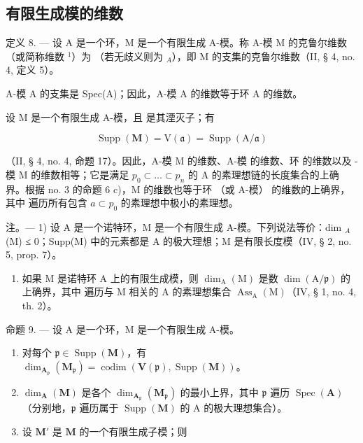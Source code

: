 \subsection{有限生成模的维数}

定义 8. — 设 A 是一个环，M 是一个有限生成 A-模。称 A-模 M 的克鲁尔维数（或简称维数 \(^{1}\)）为  （若无歧义则为 \(_{A}\)），即 M 的支集的克鲁尔维数（II, § 4, no. 4, 定义 5）。

A-模 A 的支集是 Spec(A)；因此，A-模 A 的维数等于环 A 的维数。

设 M 是一个有限生成 A-模，且  是其湮灭子；有

\[
\operatorname{Supp} (\mathbf {M}) = \mathrm{V} (\mathfrak {a}) = \operatorname{Supp} (\mathrm{A} / \mathfrak {a})
\]

（II, § 4, no. 4, 命题 17）。因此，A-模 M 的维数、A-模  的维数、环  的维数以及  -模 M 的维数相等；它是满足 \(p_0 \subset \ldots \subset p_n\) 的 A 的素理想链的长度集合的上确界。根据 no. 3 的命题 6 c)，M 的维数也等于环  （或 A-模）  的维数的上确界，其中  遍历所有包含 \(a \subset p_0\) 的素理想中极小的素理想。

注。— 1) 设 A 是一个诺特环，M 是一个有限生成 A-模。下列说法等价：dim \(_{A}\) (M) ≤ 0；Supp(M) 中的元素都是 A 的极大理想；M 是有限长度模（IV, § 2, no. 5, prop. 7）。

\begin{enumerate}
\def\labelenumi{\arabic{enumi})}
\setcounter{enumi}{1}
\tightlist
\item
  如果 M 是诺特环 A 上的有限生成模，则 \(\dim_{\mathrm{A}}(\mathrm{M})\) 是数 \(\dim(\mathrm{A}/\mathfrak{p})\) 的上确界，其中  遍历与 M 相关的 A 的素理想集合 \(\operatorname{Ass}_{\mathrm{A}}(\mathrm{M})\)（IV, § 1, no. 4, th. 2）。
\end{enumerate}

命题 9. — 设 A 是一个环，M 是一个有限生成 A-模。

\begin{enumerate}
\def\labelenumi{\alph{enumi})}
\item
  对每个 \(\mathfrak{p} \in \operatorname{Supp}(\mathbf{M})\)，有 \(\dim_{\mathbf{A}_{\mathfrak{p}}}(\mathbf{M}_{\mathfrak{p}}) = \operatorname{codim}(\mathbf{V}(\mathfrak{p}), \operatorname{Supp}(\mathbf{M}))\)。
\item
  \(\dim_{\mathbf{A}}(\mathbf{M})\) 是各个 \(\dim_{\mathbf{A}_{\mathfrak{p}}}(\mathbf{M}_{\mathfrak{p}})\) 的最小上界，其中 \(\mathfrak{p}\) 遍历 \(\operatorname{Spec}(\mathbf{A})\)（分别地，\(\mathfrak{p}\) 遍历属于 \(\operatorname{Supp}(\mathbf{M})\) 的 A 的极大理想集合）。
\item
  设 \(\mathbf{M}'\) 是 \(\mathbf{M}\) 的一个有限生成子模；则
\end{enumerate}

